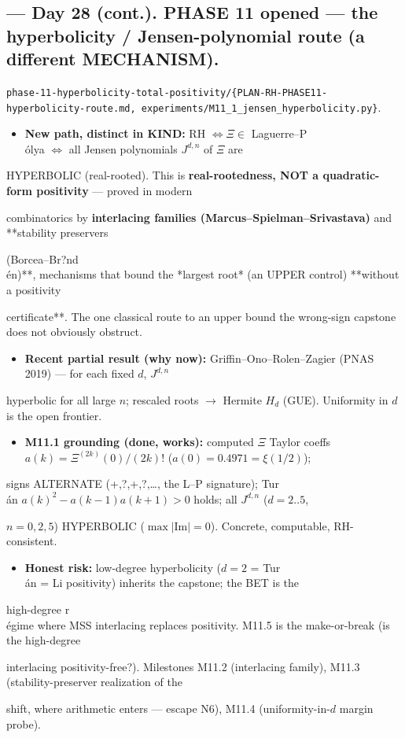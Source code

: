 \documentclass[10pt]{article}
\begin{document}
\subsection*{ --- Day 28 (cont.). PHASE 11 opened --- the hyperbolicity / Jensen-polynomial route (a different MECHANISM).}
\texttt{phase-11-hyperbolicity-total-positivity/\{PLAN-RH-PHASE11-hyperbolicity-route.md, experiments/M11\_1\_jensen\_hyperbolicity.py\}}.\par
\begin{itemize}
\item \textbf{New path, distinct in KIND:} RH $\iff\Xi\in$ Laguerre--P\\\'olya $\iff$ all Jensen polynomials $J^{d,n}$ of $\Xi$ are
\end{itemize}
  HYPERBOLIC (real-rooted). This is \textbf{real-rootedness, NOT a quadratic-form positivity} --- proved in modern\par
  combinatorics by \textbf{interlacing families (Marcus--Spielman--Srivastava)} and **stability preservers\par
  (Borcea--Br?nd\\\'en)**, mechanisms that bound the *largest root* (an UPPER control) **without a positivity\par
  certificate**. The one classical route to an upper bound the wrong-sign capstone does not obviously obstruct.\par
\begin{itemize}
\item \textbf{Recent partial result (why now):} Griffin--Ono--Rolen--Zagier (PNAS 2019) --- for each fixed $d$, $J^{d,n}$
\end{itemize}
  hyperbolic for all large $n$; rescaled roots \ensuremath{\to} Hermite $H_d$ (GUE). Uniformity in $d$ is the open frontier.\par
\begin{itemize}
\item \textbf{M11.1 grounding (done, works):} computed $\Xi$ Taylor coeffs $a(k)=\Xi^{(2k)}(0)/(2k)!$ ($a(0)=0.4971=\xi(1/2)$);
\end{itemize}
  signs ALTERNATE (+,?,+,?,\ldots, the L--P signature); Tur\\\'an $a(k)^2-a(k-1)a(k+1)>0$ holds; all $J^{d,n}$ ($d{=}2..5$,\par
  $n{=}0,2,5$) HYPERBOLIC ($\max|\mathrm{Im}|=0$). Concrete, computable, RH-consistent.\par
\begin{itemize}
\item \textbf{Honest risk:} low-degree hyperbolicity ($d{=}2$ = Tur\\\'an = Li positivity) inherits the capstone; the BET is the
\end{itemize}
  high-degree r\\\'egime where MSS interlacing replaces positivity. M11.5 is the make-or-break (is the high-degree\par
  interlacing positivity-free?). Milestones M11.2 (interlacing family), M11.3 (stability-preserver realization of the\par
  shift, where arithmetic enters --- escape N6), M11.4 (uniformity-in-$d$ margin probe).\par
\end{document}
